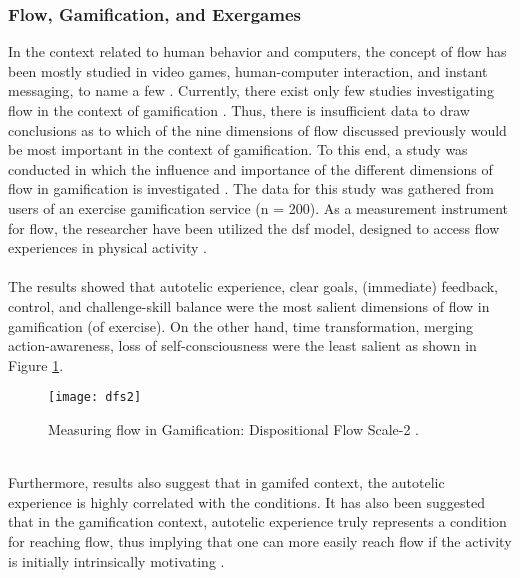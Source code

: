 \subsubsection{Flow, Gamification, and Exergames}
In the context related to human behavior and computers, the concept of flow has been mostly studied in video games, human-computer interaction, and instant messaging, to name a few \cite{hamari2014measuring}. Currently, there exist only few studies investigating flow in the context of gamification \cite{hamari2014measuring, sillaots2014achieving}. Thus, there is insufficient data to draw conclusions as to which of the nine dimensions of flow discussed previously would be most important in the context of gamification. To this end, a study was conducted in which the influence and importance of the different dimensions of flow in gamification is investigated \cite{hamari2014measuring}. The data for this study was gathered from users of an exercise gamification service (n = 200). As a measurement instrument for flow, the researcher have been utilized the \acrfull{dsf} model, designed to access flow experiences in physical activity \cite{jackson2002assessing}. \\\\The results showed that autotelic experience, clear goals, (immediate) feedback, control, and challenge-skill balance were the most salient dimensions of flow in gamification (of exercise). On the other hand, time transformation, merging action-awareness, loss of self-consciousness were the least salient as shown in Figure \ref{fig:dfs2}.\\
\begin{figure}[h]
    \centering
    \texttt{[image: dfs2]}
    \caption{Measuring flow in Gamification: Dispositional Flow Scale-2 \cite{dfs2}.}
    \label{fig:dfs2}
\end{figure}\\
Furthermore, results also suggest that in gamifed context, the autotelic experience is highly correlated with the conditions. It has also been suggested that in the gamification context, autotelic experience truly represents a condition for reaching flow, thus implying that one can more easily reach flow if the activity is initially intrinsically motivating \cite{hamari2014measuring}.\\\\

